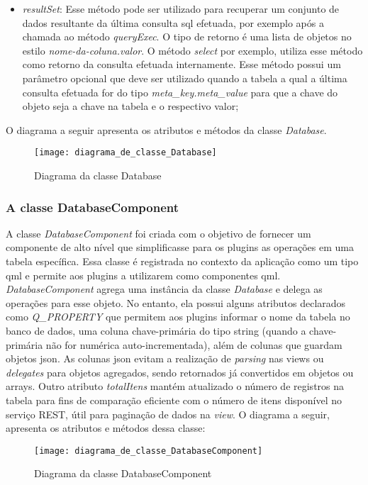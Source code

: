 \begin{itemize}
	\item \textit{resultSet}: Esse método pode ser utilizado para recuperar um conjunto de dados resultante da última consulta sql efetuada, por exemplo após a chamada ao método \textit{queryExec}. O tipo de retorno é uma lista de objetos no estilo \textit{nome-da-coluna.valor}. O método \textit{select} por exemplo, utiliza esse método como retorno da consulta efetuada internamente. Esse método possui um parâmetro opcional que deve ser utilizado quando a tabela a qual a última consulta efetuada for do tipo \textit{meta\_key.meta\_value} para que a chave do objeto seja a chave na tabela e o respectivo valor;
\end{itemize}

O diagrama a seguir apresenta os atributos e métodos da classe \textit{Database}.

\begin{figure}[h]
	\texttt{[image: diagrama\_de\_classe\_Database]}
	\centering
	\caption{Diagrama da classe Database}
\end{figure}

\subsubsection{A classe DatabaseComponent}\label{sec:solucao-desenvolvida}
A classe \textit{DatabaseComponent} foi criada com o objetivo de fornecer um componente de alto nível que simplificasse para os plugins as operações em uma tabela específica. Essa classe é registrada no contexto da aplicação como um tipo qml e permite aos plugins a utilizarem como componentes qml. \textit{DatabaseComponent} agrega uma instância da classe \textit{Database} e delega as operações para esse objeto. No entanto, ela possui alguns atributos declarados como \textit{Q\_PROPERTY} que permitem aos plugins informar o nome da tabela no banco de dados, uma coluna chave-primária do tipo string (quando a chave-primária não for numérica auto-incrementada), além de colunas que guardam objetos json. As colunas json evitam a realização de \textit{parsing} nas views ou \textit{delegates} para objetos agregados, sendo retornados já convertidos em objetos ou arrays. Outro atributo \textit{totalItens} mantém atualizado o número de registros na tabela para fins de comparação eficiente com o número de itens disponível no serviço REST, útil para paginação de dados na \textit{view}. O diagrama a seguir, apresenta os atributos e métodos dessa classe:

\begin{figure}[H]
	\texttt{[image: diagrama\_de\_classe\_DatabaseComponent]}
	\centering
	\caption{Diagrama da classe DatabaseComponent}
\end{figure}

